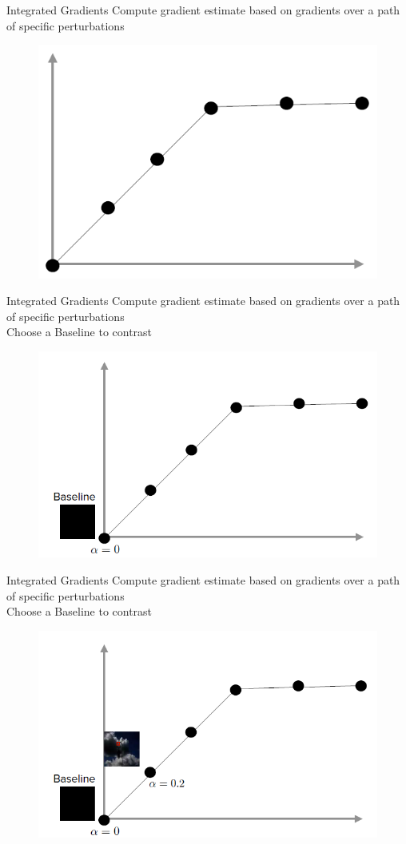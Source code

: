 \documentclass[11pt,compress,t,notes=noshow, aspectratio=169, xcolor=table]{beamer}
\begin{document}
\begin{frame}{Integrated Gradients}
    Compute gradient estimate based on gradients over a path of specific perturbations
    \begin{figure}
    \bigskip
    \bigskip
       \includegraphics[width=0.6\linewidth]{bild28}
    \end{figure}
\end{frame}

\begin{frame}{Integrated Gradients}
    Compute gradient estimate based on gradients over a path of specific perturbations\\
    Choose a Baseline to contrast %
    \begin{figure}
    \bigskip
    \bigskip
       \includegraphics[width=0.6\linewidth]{bild29}
    \end{figure}
\end{frame}

\begin{frame}{Integrated Gradients}
    Compute gradient estimate based on gradients over a path of specific perturbations\\
    Choose a Baseline to contrast %
    \begin{figure}
    \bigskip
    \bigskip
       \includegraphics[width=0.6\linewidth]{bild30}
    \end{figure}
\end{frame}
\end{document}
